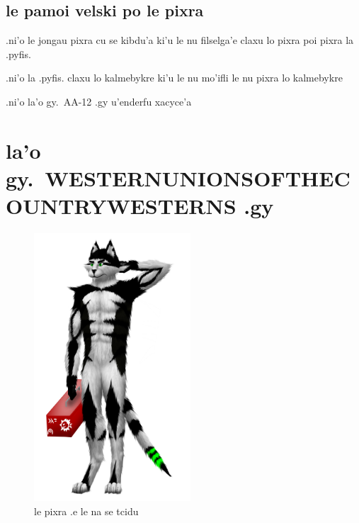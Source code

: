\documentclass{report}
\newcommand\imageheight{10cm}
\begin{document}
\section{le pamoi velski po le pixra}
.ni'o le jongau pixra cu se kibdu'a ki'u le nu filselga'e claxu lo pixra poi pixra la .pyfis.

.ni'o la .pyfis. claxu lo kalmebykre ki'u le nu mo'ifli le nu pixra lo kalmebykre

.ni'o la'o gy.\ AA-12 .gy u'enderfu xacyce'a
\chapter{la'o gy.\ WESTERNUNIONSOFTHECOUNTRYWESTERNS .gy}
\begin{figure}[ht]
	\centering
	\includegraphics[height=\imageheight]{50x/toolbox/westernunionsofthecountrywesterns.png}
	\caption[center]{le pixra .e le na se tcidu}
\end{figure}
\end{document}
